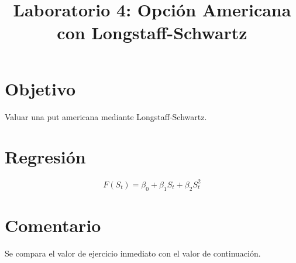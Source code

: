 \documentclass[12pt]{article}
\begin{document}
\title{Laboratorio 4: Opción Americana con Longstaff-Schwartz}
\maketitle
\section{Objetivo}
Valuar una put americana mediante Longstaff-Schwartz.
\section{Regresión}
\[ F(S_t)=\beta_0+\beta_1S_t+\beta_2S_t^2 \]
\section{Comentario}
Se compara el valor de ejercicio inmediato con el valor de continuación.
\end{document}
